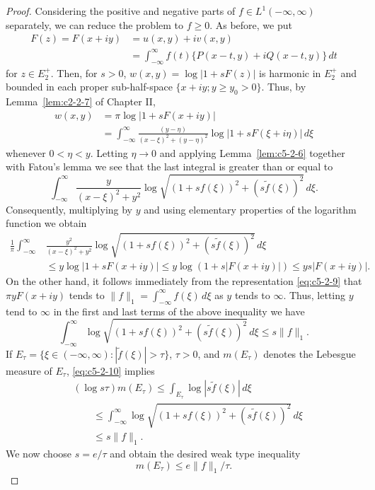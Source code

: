 \begin{proof}
Considering the positive and negative parts of $f \in L^{1}(-\infty, \infty)$
separately, we can reduce the problem to $f \geq 0$. As before, we put
\begin{equation}\label{eq:c5-2-9}
\begin{aligned}F(z)=F(x+iy)&=u(x,y)+iv(x,y)\\
&=\int_{-\infty}^{\infty}f(t)\{P(x-t,y)+iQ(x-t,y)\}\,dt\end{aligned}
\end{equation}
for $z \in E_{2}^{+}$. Then, for $s > 0$,
$w(x, y) = \log|1 + sF(z)|$ is harmonic in $E_{2}^{+}$ and bounded in each
proper sub-half-space $\{x + iy ; y \geq y_{0} > 0\}$. Thus, by
Lemma~\ref{lem:c2-2-7} of Chapter II,
\begin{align*}
w(x,y)&=\pi\log|1+sF(x+iy)|\\
&=\int_{-\infty}^{\infty}\frac{(y-\eta)}{(x-\xi)^{2}+(y-\eta)^{2}}
\log|1+sF(\xi+i\eta)|\,d\xi
\end{align*}
whenever $0 < \eta < y$. Letting $\eta \to 0$ and applying
Lemma~\ref{lem:c5-2-6} together with Fatou's lemma we see that the last
integral is greater than or equal to
\[
\int_{-\infty}^{\infty}\frac{y}{(x-\xi)^{2}+y^{2}}
\log\sqrt{(1+sf(\xi))^{2}+(s\tilde{f}(\xi))^{2}}\,d\xi.
\]
Consequently, multiplying by $y$ and using elementary properties of the
logarithm function we obtain
\begin{align*}
\frac{1}{\pi}\int_{-\infty}^{\infty}&\frac{y^{2}}{(x-\xi)^{2}+y^{2}}
\log\sqrt{(1+sf(\xi))^{2}+(s\tilde{f}(\xi))^{2}}\,d\xi\\
&\leq y\log|1+sF(x+iy)|\leq y\log(1+s|F(x+iy)|)\leq ys|F(x+iy)|.
\end{align*}
On the other hand, it follows immediately from the representation
\eqref{eq:c5-2-9} that $\pi yF(x + iy)$ tends to
$\|f\|_{1} = \int_{-\infty}^{\infty}f(\xi)\,d\xi$ as $y$ tends to $\infty$.
Thus, letting $y$ tend to $\infty$ in the first and last terms of the above
inequality we have
\begin{equation}\label{eq:c5-2-10}
\int_{-\infty}^{\infty}\log\sqrt{(1+sf(\xi))^{2}+(s\tilde{f}(\xi))^{2}}\,d\xi
\leq s\|f\|_{1}.
\end{equation}
If $E_{\tau} = \{\xi \in (-\infty, \infty) : |\tilde{f}(\xi)| > \tau\}$,
$\tau > 0$, and $m(E_{\tau})$ denotes the Lebesgue measure of $E_{\tau}$,
\eqref{eq:c5-2-10} implies
\[
\begin{aligned}&(\log s\tau)m(E_{\tau})\leq\int_{E_{\tau}}\log|s\tilde{f}(\xi)|\,d\xi\\
&\qquad\leq\int_{-\infty}^{\infty}\log\sqrt{(1+sf(\xi))^{2}+(s\tilde{f}(\xi))^{2}}\,d\xi\\
&\qquad\leq s\|f\|_{1}.\end{aligned}
\]
We now choose $s = e/\tau$ and obtain the desired weak type inequality
\[
m(E_{\tau})\leq e\|f\|_{1}/\tau.
\]
\end{proof}

